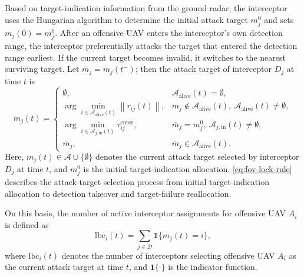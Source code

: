 \documentclass{cja}
\begin{document}
Based on target-indication information from the ground radar, the interceptor uses the Hungarian algorithm to determine the initial attack target $m_j^0$ and sets $m_j(0)=m_j^0$. After an offensive UAV enters the interceptor's own detection range, the interceptor preferentially attacks the target that entered the detection range earliest. If the current target becomes invalid, it switches to the nearest surviving target. Let $\bar m_j=m_j(t^-)$; then the attack target of interceptor $D_j$ at time $t$ is
\begin{equation}
m_j(t)=
\begin{cases}
\emptyset,
& \mathcal A_{\mathrm{alive}}(t)=\emptyset,\\[1mm]
\displaystyle \arg\min_{i\in \mathcal A_{\mathrm{alive}}(t)}
\left\|r_{ij}(t)\right\|,
& \bar m_j\notin \mathcal A_{\mathrm{alive}}(t),\
\mathcal A_{\mathrm{alive}}(t)\neq\emptyset,\\[3mm]
\displaystyle \arg\min_{i\in \mathcal A_{j,\mathrm{in}}(t)}
\tau_{ij}^{\mathrm{enter}},
& \bar m_j=m_j^0,\
\mathcal A_{j,\mathrm{in}}(t)\neq\emptyset,\\[3mm]
\bar m_j,
& \bar m_j\in \mathcal A_{\mathrm{alive}}(t).
\end{cases}
\label{eq:fov-lock-rule}
\end{equation}
Here, $m_j(t)\in\mathcal A\cup\{\emptyset\}$ denotes the current attack target selected by interceptor $D_j$ at time $t$, and $m_j^0$ is the initial target-indication allocation. \eqref{eq:fov-lock-rule} describes the attack-target selection process from initial target-indication allocation to detection takeover and target-failure reallocation.

On this basis, the number of active interceptor assignments for offensive UAV $A_i$ is defined as
\begin{equation}
\mathrm{lbc}_i(t)
=
\sum_{j\in\mathcal D}
\mathbf{1}\bigl\{m_j(t)=i\bigr\},
\label{eq:lbc-def}
\end{equation}
where $\mathrm{lbc}_i(t)$ denotes the number of interceptors selecting offensive UAV $A_i$ as the current attack target at time $t$, and $\mathbf{1}\{\cdot\}$ is the indicator function.
\end{document}
